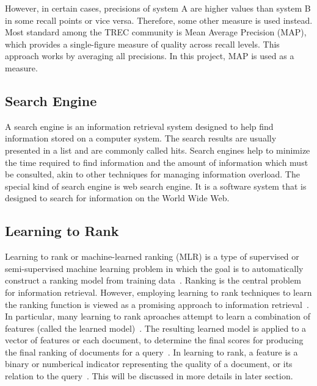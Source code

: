 However, in certain cases, precisions of system A are higher values than system B in some recall points or vice versa. Therefore,
some other measure is used instead. Most standard among the TREC community is Mean Average Precision (MAP), which provides a single-figure 
measure of quality across recall levels. This approach works by averaging all precisions. In this project, MAP is used as a measure.

\subsection{Search Engine}
A search engine is an information retrieval system designed to help find information stored on a computer system. The search results are usually 
presented in a list and are commonly called hits. Search engines help to minimize the time required to find information and the amount of 
information which must be consulted, akin to other techniques for managing information overload. The special kind of search engine is 
web search engine. It is a software system that is designed to search for information on the World Wide Web.

\subsection{Learning to Rank}
Learning to rank or machine-learned ranking (MLR) is a type of supervised or semi-supervised machine learning problem in which the goal is 
to automatically construct a ranking model from training data~\cite{letor}. Ranking is the central problem for information retrieval. 
However, employing learning to rank techniques to learn the ranking function is viewed as
a promising approach to information retrieval~\cite{letor}. In particular, many learning to rank aproaches attempt to learn a combination of features
(called the learned model)~\cite[P. 3]{learningmodel}. The resulting learned model is applied to a vector of features or each document, to determine the final scores for 
producing the final ranking of documents for a query~\cite[P. 3]{learningmodel}. In learning to rank, a feature is a binary or numberical indicator 
representing the quality of a document, or its relation to the query~\cite[P. 4]{learningmodel}. This will be discussed in more details in later section.

